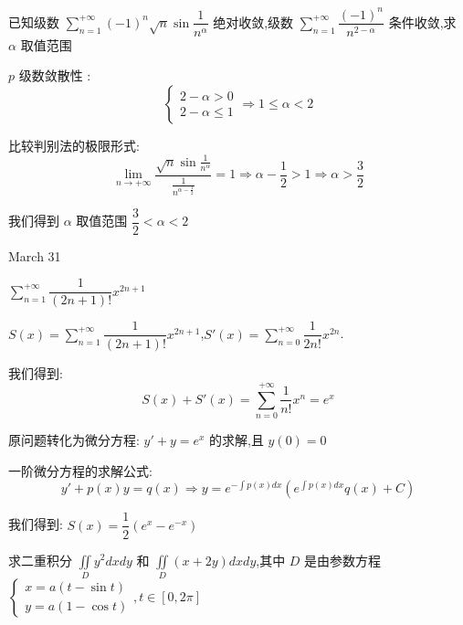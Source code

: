 \begin{example}[][Exam: 29.4.17]
	已知级数 $\sum\limits_{n=1}^{+\infty}(-1)^n\sqrt{n}\sin \dfrac{1}{n^{\alpha}}$ 绝对收敛,级数 $\sum\limits_{n=1}^{+\infty}\dfrac{(-1)^n}{n^{2-\alpha}}$ 条件收敛,求 $\alpha$ 取值范围
\end{example}

\begin{solution}
	
	$p$ 级数敛散性 : 
	$$\left\lbrace \begin{array}{l}
		2-\alpha>0\\2-\alpha\leq 1
	\end{array}\right. \Rightarrow 1\leq\alpha<2$$
	
	比较判别法的极限形式: 
	$$\lim\limits_{n\rightarrow+\infty}\dfrac{\sqrt{n}\sin\frac{1}{n^{\alpha}}}{\frac{1}{n^{\alpha-\frac{1}{2}}}}=1\Rightarrow \alpha-\frac{1}{2}>1\Rightarrow \alpha >\frac{3}{2}$$
	
	我们得到 $\alpha$ 取值范围 $\dfrac{3}{2}<\alpha<2$
\end{solution}

\textcolor{purplea}{March 31}

\begin{example}[][Exam: 29.4.18]
	$\sum\limits_{n=1}^{+\infty}\dfrac{1}{(2n+1)!}x^{2n+1}$
\end{example}

\begin{solution}
	
	$S(x)=\sum\limits_{n=1}^{+\infty}\dfrac{1}{(2n+1)!}x^{2n+1}$,$S'(x)=\sum\limits_{n=0}^{+\infty}\dfrac{1}{2n!}x^{2n}$.
	
	我们得到: $$S(x)+S'(x)=\sum\limits_{n=0}^{+\infty}\frac{1}{n!}x^{n}=e^{x}$$
	
	原问题转化为微分方程: $y'+y=e^x$ 的求解,且 $y(0)=0$
	
	一阶微分方程的求解公式: $$y'+p(x)y=q(x)\Rightarrow y=e^{-\int p(x)dx}(e^{\int p(x)dx}q(x)+C)$$
	
	我们得到:  $S(x)=\dfrac{1}{2}(e^{x}-e^{-x})$
\end{solution}

\begin{example}[][Exam: 29.4.19]
	求二重积分 $\iint\limits_{D}y^2dxdy$ 和 $\iint\limits_{D}(x+2y)dxdy$,其中 $D$ 是由参数方程 $\left\lbrace\begin{array}{l}
		x=a(t-\sin t)\\y=a(1-\cos t)
	\end{array} \right. ,t\in [0,2\pi]$
\end{example}

